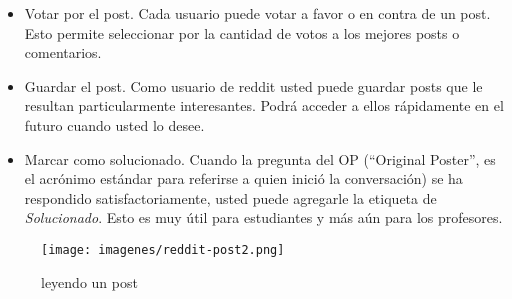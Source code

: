 \documentclass[]{article}
\makeatletter
\def\maxwidth{\ifdim\Gin@nat@width>\linewidth\linewidth
\else\Gin@nat@width\fi}
\let\Oldincludegraphics\includegraphics
\renewcommand{\includegraphics}[1]{\Oldincludegraphics[width=\maxwidth]{#1}}
\makeatother
\begin{document}
\begin{itemize}
\item
  Votar por el post. Cada usuario puede votar a favor o en contra de un
  post. Esto permite seleccionar por la cantidad de votos a los mejores
  posts o comentarios.
\item
  Guardar el post. Como usuario de reddit usted puede guardar posts que
  le resultan particularmente interesantes. Podrá acceder a ellos
  rápidamente en el futuro cuando usted lo desee.
\item
  Marcar como solucionado. Cuando la pregunta del OP (``Original
  Poster'', es el acrónimo estándar para referirse a quien inició la
  conversación) se ha respondido satisfactoriamente, usted puede
  agregarle la etiqueta de \emph{Solucionado}. Esto es muy útil para
  estudiantes y más aún para los profesores.
\end{itemize}
\begin{figure}[htbp]
\centering
\texttt{[image: imagenes/reddit-post2.png]}
\caption{leyendo un post}
\end{figure}
\end{document}
